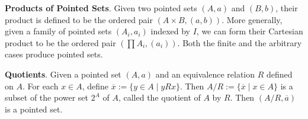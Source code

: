 \documentclass[12pt]{article}
\begin{document}
\textbf{Products of Pointed Sets}.  Given two pointed sets $(A,a)$ and $(B,b)$, their product is defined to be the ordered pair $(A\times B,(a,b))$.  More generally, given a family of pointed sets $(A_i,a_i)$ indexed by $I$, we can form their Cartesian product to be the ordered pair $(\prod A_i, (a_i))$.  Both the finite and the arbitrary cases produce pointed sets.

\textbf{Quotients}.  Given a pointed set $(A,a)$ and an equivalence relation $R$ defined on $A$.  For each $x\in A$, define $\overline{x}:=\lbrace y\in A \mid y R x\rbrace$.  Then $A/R:=\lbrace \overline{x}\mid x\in A\rbrace$ is a subset of the power set $2^A$ of $A$, called the quotient of $A$ by $R$.  Then $(A/R,\overline{a})$ is a pointed set.
\end{document}
